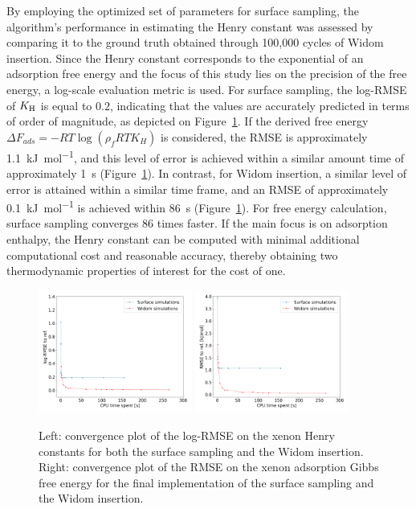 \documentclass[main]{subfiles}
\begin{document}
By employing the optimized set of parameters for surface sampling, the algorithm's performance in estimating the Henry constant was assessed by comparing it to the ground truth obtained through 100,000 cycles of Widom insertion. Since the Henry constant corresponds to the exponential of an adsorption free energy and the focus of this study lies on the precision of the free energy, a log-scale evaluation metric is used. For surface sampling, the log-RMSE of $K_{\text{H}}$ is equal to $0.2$, indicating that the values are accurately predicted in terms of order of magnitude, as depicted on Figure~\ref{fgr:convergence_free_energy}. If the derived free energy $\Delta F_{ads} = -RT \log(\rho_fRT K_H)$ is considered, the RMSE is approximately \SI{1.1}{\kilo\joule\per\mole}, and this level of error is achieved within a similar amount time of approximately \SI{1}{\second} (Figure~\ref{fgr:convergence_free_energy}). In contrast, for Widom insertion, a similar level of error is attained within a similar time frame, and an RMSE of approximately \SI{0.1}{\kilo\joule\per\mole} is achieved within \SI{86}{\second} (Figure~\ref{fgr:convergence_free_energy}). For free energy calculation, surface sampling converges 86 times faster. If the main focus is on adsorption enthalpy, the Henry constant can be computed with minimal additional computational cost and reasonable accuracy, thereby obtaining two thermodynamic properties of interest for the cost of one.

\begin{figure}[ht]
  \centering
  \includegraphics[width=0.45\textwidth]{figures/3-fastsim/log_henry_convergence.jpg}
  \includegraphics[width=0.45\textwidth]{figures/3-fastsim/gibbs_free_energy_convergence.jpg}
  \caption{ Left: convergence plot of the log-RMSE on the xenon Henry constants for both the surface sampling and the Widom insertion. Right: convergence plot of the RMSE on the xenon adsorption Gibbs free energy for the final implementation of the surface sampling and the Widom insertion. }\label{fgr:convergence_free_energy}
\end{figure}
\end{document}
